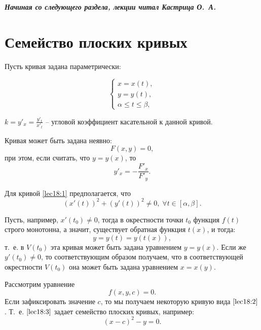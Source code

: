 \documentclass[../../main.tex]{subfiles}
\begin{document}
\hrulefill

\bigskip

\begin{center}
{\it \textbf{Начиная со следующего раздела, лекции читал Кастрица О.~А.}} 
\end{center}

\hrulefill

\bigskip

\section{Семейство плоских кривых}

Пусть кривая задана параметрически:

 \begin{equation} \begin{cases}
 \label{lec18:1}
x=x(t),\\
y=y(t), \\
\alpha \le t \le \beta,
\end{cases}
\end{equation}

$k = y'_x = \frac{y'_t}{x'_t}$ \--- угловой коэффициент 
касательной к данной кривой.

Кривая может быть задана неявно:
\begin{equation}\label{lec18:2} F\left( x,y \right)  = 0, \end{equation}
при этом, если считать, что $y=y(x)$, то
\[ y'_x = - \frac{F'_x}{F'_y}.\]

Для кривой \eqref{lec18:1} предполагается, что
\[ \left( x' \left( t \right) \right)^2 + \left( y' \left( t \right) \right)^2 
\ne 0, \;  \forall t \in \left[ \alpha, \beta \right]. \]

Пусть, например, $x'\left( t_0 \right) \ne 0 $, тогда в окрестности точки 
$t_0$ 
функция $f\left( t \right) $ строго монотонна, а значит, существует обратная 
функция $t\left( x \right) $, и тогда:
\[ y = y \left( t \right) = y \left( t\left( x \right) \right), \]
т.~е. в $V \left( t_0 \right) $ эта кривая может быть задана уравнением
$y=y(x)$.
Если же $y'(t_0) \ne 0$, то соответствующим образом получаем, что в 
соответствующей окрестности $V \left( 
t_0 \right) $ она может быть задана уравнением $x=x\left( y \right) $.

Рассмотрим уравнение
\begin{equation} \label{lec18:3} f \left( x,y,c \right) = 0.  \end{equation}
Если зафиксировать значение $c$, то мы получаем некоторую кривую вида 
$\eqref{lec18:2}$. Т.~е. $\eqref{lec18:3}$ задает семейство плоских кривых, 
например:
\[ \left( x-c \right)^2 - y = 0. \]
\end{document}
